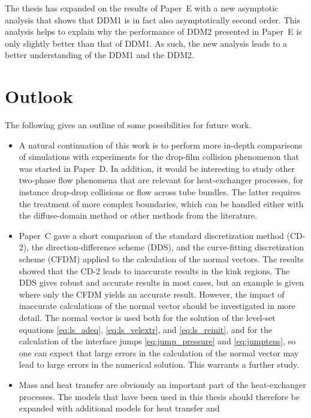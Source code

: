\documentclass[11pt,b5paper,DIV=calc,BCOR1.3cm,headings=small,%
               footinclude=false,headsepline]{scrbook}
\begin{document}
The thesis has expanded on the results of Paper~E with a new asymptotic
analysis that shows that DDM1 is in fact also asymptotically second order.
This analysis helps to explain why the performance of DDM2 presented in Paper~E
is only slightly better than that of DDM1.  As such, the new analysis leads to
a better understanding of the DDM1 and the DDM2.

\section*{Outlook}
The following gives an outline of some possibilities for future work.
\begin{itemize}
  \item A natural continuation of this work is to perform more in-depth
    comparisons of simulations with experiments for the drop-film collision
    phenomenon that was started in Paper~D.  In addition, it would be
    interesting to study other two-phase flow phenomena that are relevant for
    heat-exchanger processes, for instance drop-drop collisions or flow across
    tube bundles.  The latter requires the treatment of more complex boundaries,
    which can be handled either with the diffuse-domain method or other methods
    from the literature.
  \item Paper~C gave a short comparison of the standard discretization method
    (CD-2), the direction-difference scheme (DDS), and the curve-fitting
    discretization scheme (CFDM) applied to the calculation of the normal
    vectors.  The results showed that the CD-2 leads to inaccurate results in
    the kink regions.  The DDS gives robust and accurate results in most cases,
    but an example is given where only the CFDM yields an accurate result.
    However, the impact of inaccurate calculations of the normal vector should
    be investigated in more detail.  The normal vector is used both for the
    solution of the level-set equations \eqref{eq:ls_adeq},
    \eqref{eq:ls_velextr}, and \eqref{eq:ls_reinit}, and for the calculation of
    the interface jumps \eqref{eq:jump_pressure} and \eqref{eq:jumptens}, so
    one can expect that large errors in the calculation of the normal vector
    may lead to large errors in the numerical solution.  This warrants
    a further study.
  \item Mass and heat transfer are obviously an important part of the
    heat-exchanger processes.  The models that have been used in this thesis
    should therefore be expanded with additional models for heat transfer and

\end{itemize}
\end{document}
